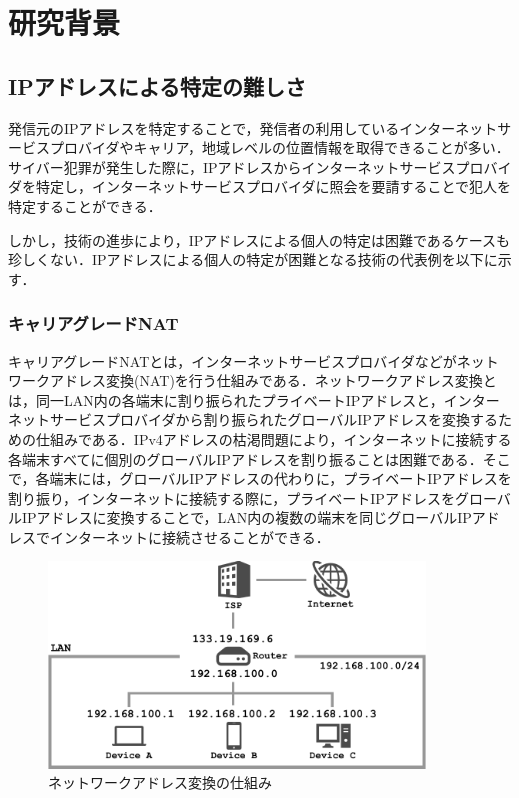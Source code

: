 \documentclass[10pt, a4paper]{jreport}
\begin{document}
\chapter{研究背景}
\section{IPアドレスによる特定の難しさ}
発信元のIPアドレスを特定することで，発信者の利用しているインターネットサービスプロバイダやキャリア，地域レベルの位置情報を取得できることが多い．サイバー犯罪が発生した際に，IPアドレスからインターネットサービスプロバイダを特定し，インターネットサービスプロバイダに照会を要請することで犯人を特定することができる．

しかし，技術の進歩により，IPアドレスによる個人の特定は困難であるケースも珍しくない．IPアドレスによる個人の特定が困難となる技術の代表例を以下に示す．

\subsection{キャリアグレードNAT}
キャリアグレードNATとは，インターネットサービスプロバイダなどがネットワークアドレス変換(NAT)を行う仕組みである．ネットワークアドレス変換とは，同一LAN内の各端末に割り振られたプライベートIPアドレスと，インターネットサービスプロバイダから割り振られたグローバルIPアドレスを変換するための仕組みである．IPv4アドレスの枯渇問題により，インターネットに接続する各端末すべてに個別のグローバルIPアドレスを割り振ることは困難である．そこで，各端末には，グローバルIPアドレスの代わりに，プライベートIPアドレスを割り振り，インターネットに接続する際に，プライベートIPアドレスをグローバルIPアドレスに変換することで，LAN内の複数の端末を同じグローバルIPアドレスでインターネットに接続させることができる．

\begin{figure}[H]
	\begin{center}
		\includegraphics[width=100mm]{figures/nat.pdf}
	\end{center}
	\caption{ネットワークアドレス変換の仕組み}
	\label{fig: nat}
\end{figure}
\end{document}
